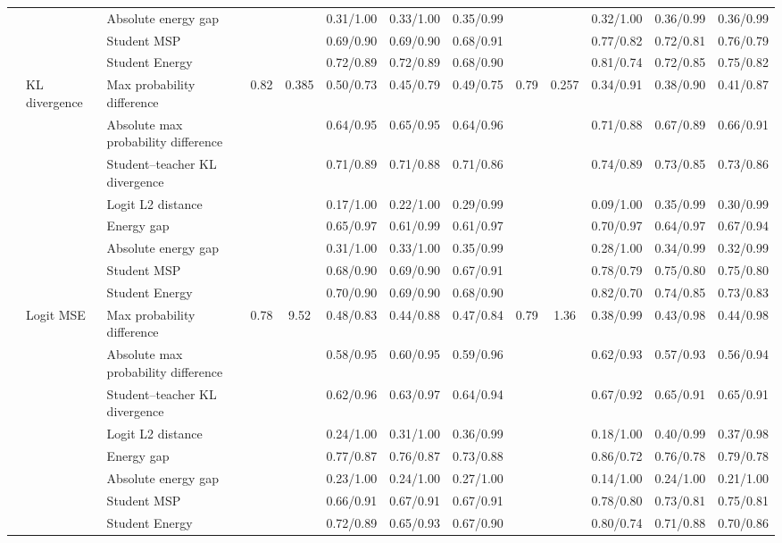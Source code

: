 \documentclass[border=2pt]{standalone}
\begin{document}
\begin{tabular}{lllcccccccccc}
 &  & Absolute energy gap &  &  & 0.31/1.00 & 0.33/1.00 & 0.35/0.99 &  &  & 0.32/1.00 & 0.36/0.99 & 0.36/0.99 \\
 &  & Student MSP &  &  & 0.69/0.90 & 0.69/0.90 & 0.68/0.91 &  &  & 0.77/0.82 & 0.72/0.81 & 0.76/0.79 \\
 &  & Student Energy &  &  & 0.72/0.89 & 0.72/0.89 & 0.68/0.90 &  &  & 0.81/0.74 & 0.72/0.85 & 0.75/0.82 \\
\addlinespace
 & KL divergence & Max probability difference & 0.82 & 0.385 & 0.50/0.73 & 0.45/0.79 & 0.49/0.75 & 0.79 & 0.257 & 0.34/0.91 & 0.38/0.90 & 0.41/0.87 \\
 &  & Absolute max probability difference &  &  & 0.64/0.95 & 0.65/0.95 & 0.64/0.96 &  &  & 0.71/0.88 & 0.67/0.89 & 0.66/0.91 \\
 &  & Student--teacher KL divergence &  &  & 0.71/0.89 & 0.71/0.88 & 0.71/0.86 &  &  & 0.74/0.89 & 0.73/0.85 & 0.73/0.86 \\
 &  & Logit L2 distance &  &  & 0.17/1.00 & 0.22/1.00 & 0.29/0.99 &  &  & 0.09/1.00 & 0.35/0.99 & 0.30/0.99 \\
 &  & Energy gap &  &  & 0.65/0.97 & 0.61/0.99 & 0.61/0.97 &  &  & 0.70/0.97 & 0.64/0.97 & 0.67/0.94 \\
 &  & Absolute energy gap &  &  & 0.31/1.00 & 0.33/1.00 & 0.35/0.99 &  &  & 0.28/1.00 & 0.34/0.99 & 0.32/0.99 \\
 &  & Student MSP &  &  & 0.68/0.90 & 0.69/0.90 & 0.67/0.91 &  &  & 0.78/0.79 & 0.75/0.80 & 0.75/0.80 \\
 &  & Student Energy &  &  & 0.70/0.90 & 0.69/0.90 & 0.68/0.90 &  &  & 0.82/0.70 & 0.74/0.85 & 0.73/0.83 \\
\addlinespace
 & Logit MSE & Max probability difference & 0.78 & 9.52 & 0.48/0.83 & 0.44/0.88 & 0.47/0.84 & 0.79 & 1.36 & 0.38/0.99 & 0.43/0.98 & 0.44/0.98 \\
 &  & Absolute max probability difference &  &  & 0.58/0.95 & 0.60/0.95 & 0.59/0.96 &  &  & 0.62/0.93 & 0.57/0.93 & 0.56/0.94 \\
 &  & Student--teacher KL divergence &  &  & 0.62/0.96 & 0.63/0.97 & 0.64/0.94 &  &  & 0.67/0.92 & 0.65/0.91 & 0.65/0.91 \\
 &  & Logit L2 distance &  &  & 0.24/1.00 & 0.31/1.00 & 0.36/0.99 &  &  & 0.18/1.00 & 0.40/0.99 & 0.37/0.98 \\
 &  & Energy gap &  &  & 0.77/0.87 & 0.76/0.87 & 0.73/0.88 &  &  & 0.86/0.72 & 0.76/0.78 & 0.79/0.78 \\
 &  & Absolute energy gap &  &  & 0.23/1.00 & 0.24/1.00 & 0.27/1.00 &  &  & 0.14/1.00 & 0.24/1.00 & 0.21/1.00 \\
 &  & Student MSP &  &  & 0.66/0.91 & 0.67/0.91 & 0.67/0.91 &  &  & 0.78/0.80 & 0.73/0.81 & 0.75/0.81 \\
 &  & Student Energy &  &  & 0.72/0.89 & 0.65/0.93 & 0.67/0.90 &  &  & 0.80/0.74 & 0.71/0.88 & 0.70/0.86 \\
\bottomrule
\end{tabular}
\end{document}
